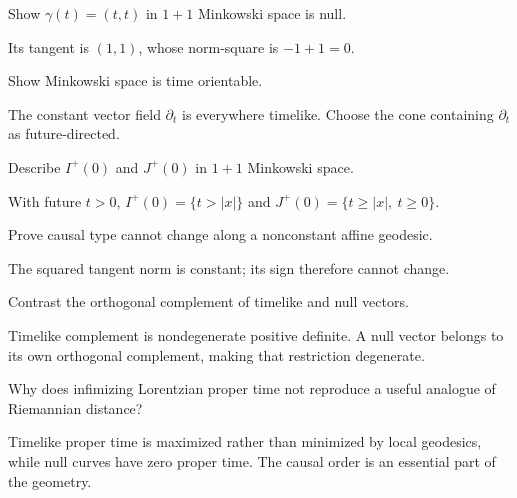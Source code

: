 \begin{problem}\label{prob:vii30-03}
Show \(\gamma(t)=(t,t)\) in \(1+1\) Minkowski space is null.
\end{problem}
\begin{solution}
Its tangent is \((1,1)\), whose norm-square is \(-1+1=0\).
\end{solution}

\begin{problem}\label{prob:vii30-04}
Show Minkowski space is time orientable.
\end{problem}
\begin{solution}
The constant vector field \(\partial_t\) is everywhere timelike. Choose the cone containing \(\partial_t\) as future-directed.
\end{solution}

\begin{problem}\label{prob:vii30-05}
Describe \(I^+(0)\) and \(J^+(0)\) in \(1+1\) Minkowski space.
\end{problem}
\begin{solution}
With future \(t>0\), \(I^+(0)=\{t>|x|\}\) and \(J^+(0)=\{t\ge|x|,\ t\ge0\}\).
\end{solution}

\begin{problem}\label{prob:vii30-06}
Prove causal type cannot change along a nonconstant affine geodesic.
\end{problem}
\begin{solution}
The squared tangent norm is constant; its sign therefore cannot change.
\end{solution}

\begin{problem}\label{prob:vii30-07}
Contrast the orthogonal complement of timelike and null vectors.
\end{problem}
\begin{solution}
Timelike complement is nondegenerate positive definite. A null vector belongs to its own orthogonal complement, making that restriction degenerate.
\end{solution}

\begin{problem}\label{prob:vii30-08}
Why does infimizing Lorentzian proper time not reproduce a useful analogue of Riemannian distance?
\end{problem}
\begin{solution}
Timelike proper time is maximized rather than minimized by local geodesics, while null curves have zero proper time. The causal order is an essential part of the geometry.
\end{solution}

